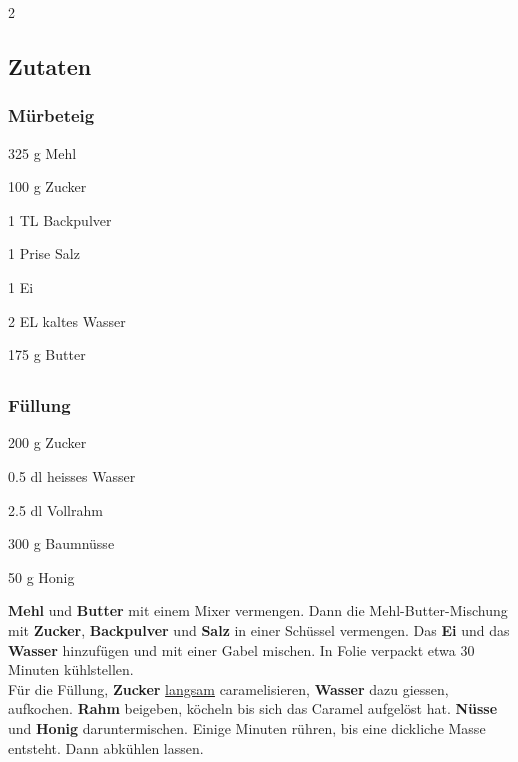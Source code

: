 \newpage
{}
\label{bundner_nusstorte}

\begin{multicols}{2}
	\subsection*{Zutaten}
	\subsubsection*{Mürbeteig}
	\begin{ingredients}
		\item 325 g Mehl
		\item 100 g Zucker
		\item 1 TL Backpulver
		\item 1 Prise Salz
		\item 1 Ei
		\item 2 EL kaltes Wasser
		\item 175 g Butter
	\end{ingredients}
	
	\columnbreak
	
	\subsection*{}
	\subsubsection*{Füllung}
	\begin{equipment}
		\item 200 g Zucker
		\item 0.5 dl heisses Wasser
		\item 2.5 dl Vollrahm
		\item 300 g Baumnüsse
		\item 50 g Honig
	\end{equipment}
\end{multicols}

\medskip

\textbf{Mehl} und \textbf{Butter} mit einem Mixer vermengen.
Dann die Mehl-Butter-Mischung mit \textbf{Zucker}, \textbf{Backpulver} und \textbf{Salz} in einer Schüssel vermengen. 
Das \textbf{Ei} und das \textbf{Wasser} hinzufügen und mit einer Gabel mischen. 
In Folie verpackt etwa 30 Minuten kühlstellen. \\

Für die Füllung, \textbf{Zucker} \underline{langsam} caramelisieren, \textbf{Wasser} dazu giessen, aufkochen. 
\textbf{Rahm} beigeben, köcheln bis sich das Caramel aufgelöst hat.
\textbf{Nüsse} und \textbf{Honig} daruntermischen.
Einige Minuten rühren, bis eine dickliche Masse entsteht.
Dann abkühlen lassen. \\

